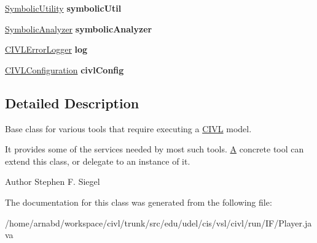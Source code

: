 \begin{DoxyCompactItemize}
\item 
\hypertarget{classedu_1_1udel_1_1cis_1_1vsl_1_1civl_1_1run_1_1IF_1_1Player_aaf4054eabafe7956bbdf608d4c3fccaa}{}\hyperlink{interfaceedu_1_1udel_1_1cis_1_1vsl_1_1civl_1_1dynamic_1_1IF_1_1SymbolicUtility}{Symbolic\+Utility} {\bfseries symbolic\+Util}\label{classedu_1_1udel_1_1cis_1_1vsl_1_1civl_1_1run_1_1IF_1_1Player_aaf4054eabafe7956bbdf608d4c3fccaa}

\item 
\hypertarget{classedu_1_1udel_1_1cis_1_1vsl_1_1civl_1_1run_1_1IF_1_1Player_a419c7159683c08f33aa174f6012f7f1d}{}\hyperlink{interfaceedu_1_1udel_1_1cis_1_1vsl_1_1civl_1_1semantics_1_1IF_1_1SymbolicAnalyzer}{Symbolic\+Analyzer} {\bfseries symbolic\+Analyzer}\label{classedu_1_1udel_1_1cis_1_1vsl_1_1civl_1_1run_1_1IF_1_1Player_a419c7159683c08f33aa174f6012f7f1d}

\item 
\hypertarget{classedu_1_1udel_1_1cis_1_1vsl_1_1civl_1_1run_1_1IF_1_1Player_adfca4ace3531b24a5ac700f9611da48a}{}\hyperlink{classedu_1_1udel_1_1cis_1_1vsl_1_1civl_1_1log_1_1IF_1_1CIVLErrorLogger}{C\+I\+V\+L\+Error\+Logger} {\bfseries log}\label{classedu_1_1udel_1_1cis_1_1vsl_1_1civl_1_1run_1_1IF_1_1Player_adfca4ace3531b24a5ac700f9611da48a}

\item 
\hypertarget{classedu_1_1udel_1_1cis_1_1vsl_1_1civl_1_1run_1_1IF_1_1Player_a5f08b0c1857eb4f8c431020aa4f88e5f}{}\hyperlink{classedu_1_1udel_1_1cis_1_1vsl_1_1civl_1_1config_1_1IF_1_1CIVLConfiguration}{C\+I\+V\+L\+Configuration} {\bfseries civl\+Config}\label{classedu_1_1udel_1_1cis_1_1vsl_1_1civl_1_1run_1_1IF_1_1Player_a5f08b0c1857eb4f8c431020aa4f88e5f}

\end{DoxyCompactItemize}


\subsection{Detailed Description}
Base class for various tools that require executing a \hyperlink{classedu_1_1udel_1_1cis_1_1vsl_1_1civl_1_1CIVL}{C\+I\+V\+L} model. 

It provides some of the services needed by most such tools. \hyperlink{structA}{A} concrete tool can extend this class, or delegate to an instance of it.

\begin{DoxyAuthor}{Author}
Stephen F. Siegel 
\end{DoxyAuthor}


The documentation for this class was generated from the following file\+:\begin{DoxyCompactItemize}
\item 
/home/arnabd/workspace/civl/trunk/src/edu/udel/cis/vsl/civl/run/\+I\+F/Player.\+java\end{DoxyCompactItemize}
